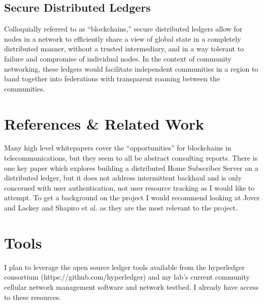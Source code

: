 \subsection{Secure Distributed Ledgers}
Colloquially referred to as ``blockchains,'' secure distributed
ledgers allow for nodes in a network to efficiently share a view of
global state in a completely distributed manner, without a trusted
intermediary, and in a way tolerant to failure and compromise of
individual nodes.\cite{BabuBlockchainTelco2016} In the context of community networking, these
ledgers would facilitate independent communities in a region to band
together into federations with transparent roaming between the
communities.

\section{References \& Related Work}
Many high level whitepapers cover the ``opportunities'' for
blockchains in
telecommunications\cite{BabuBlockchainTelco2016}\cite{BubleyBlockchainTelecomsIndustry2017}\cite{BaeOperatingmiddledigital},
but they seem to all be abstract consulting reports. There is one key
paper\cite{JoverdHSSdistributedPeertoPeer2016a} which explores
building a distributed Home Subscriber Server on a distributed ledger,
but it does not address intermittent backhaul and is only concerned
with user authentication, not user resource tracking as I would like
to attempt. To get a background on the project I would recommend
looking at Jover and Lackey \cite{JoverdHSSdistributedPeertoPeer2016a}
and Shapiro et al.\cite{ShapiroConflictfreereplicateddata2011} as they
are the most relevant to the project.

\section{Tools}

I plan to leverage the open source ledger tools available from the
hyperledger consortium (https://github.com/hyperledger) and my lab's
current community cellular network management
software\cite{Heimerllongitudinalstudylocal2015} and network
testbed. I already have access to these resources.
